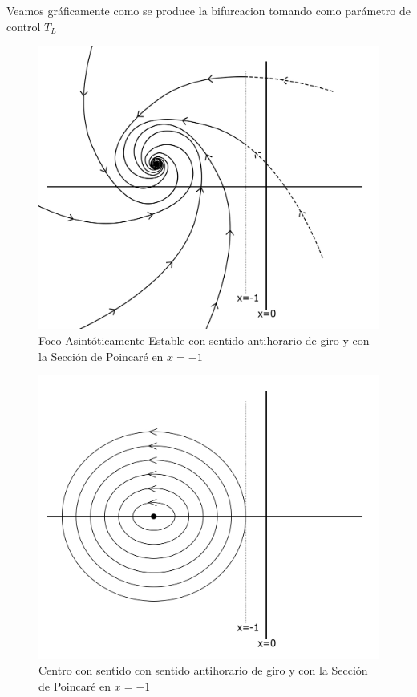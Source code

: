 \documentclass[12pt,a4paper]{report} %
\begin{document}
	\newpage
	
	Veamos gráficamente como se produce la bifurcacion tomando como parámetro de control $T_L$
	
	\begin{figure}[h]
		\centering
		\includegraphics[width=1\textwidth]{foco3.jpg}
		\caption{Foco Asintóticamente Estable con sentido antihorario de giro y con la Sección de Poincaré en $x=-1$}
		\label{fig:foco3}
	\end{figure}\smallskip
	
	\newpage
	
		\begin{figure}[h]
		\centering
		\includegraphics[width=1\textwidth]{centro2.jpg}
		\caption{Centro con sentido con sentido antihorario de giro y con la Sección de Poincaré en $x=-1$}
		\label{fig:centro2}
	\end{figure}\smallskip
	
\end{document}
